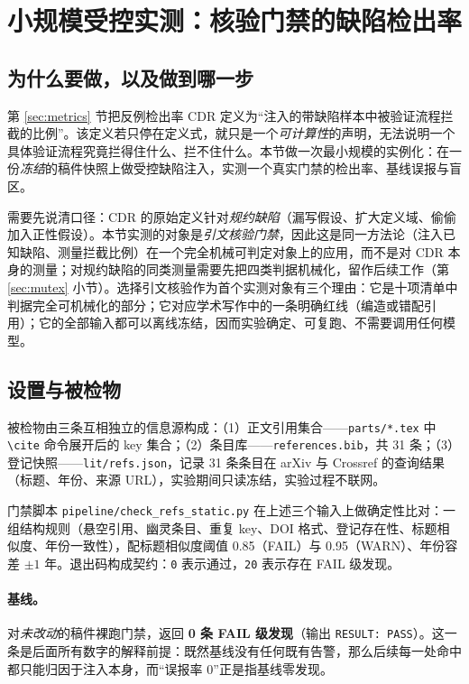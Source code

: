 \section{小规模受控实测：核验门禁的缺陷检出率}\label{sec:experiment}

\subsection{为什么要做，以及做到哪一步}

第 \ref{sec:metrics} 节把反例检出率 $\mathrm{CDR}$ 定义为“注入的带缺陷样本中被验证流程拦截的比例”。该定义若只停在定义式，就只是一个\emph{可计算性}的声明，无法说明一个具体验证流程究竟拦得住什么、拦不住什么。本节做一次最小规模的实例化：在一份\emph{冻结}的稿件快照上做受控缺陷注入，实测一个真实门禁的检出率、基线误报与盲区。

需要先说清口径：$\mathrm{CDR}$ 的原始定义针对\emph{规约缺陷}（漏写假设、扩大定义域、偷偷加入正性假设）。本节实测的对象是\emph{引文核验门禁}，因此这是同一方法论（注入已知缺陷、测量拦截比例）在一个完全机械可判定对象上的应用，而不是对 $\mathrm{CDR}$ 本身的测量；对规约缺陷的同类测量需要先把四类判据机械化，留作后续工作（第 \ref{sec:mutex} 小节）。选择引文核验作为首个实测对象有三个理由：它是十项清单中判据完全可机械化的部分；它对应学术写作中的一条明确红线（编造或错配引用）；它的全部输入都可以离线冻结，因而实验确定、可复跑、不需要调用任何模型。

\subsection{设置与被检物}

被检物由三条互相独立的信息源构成：（1）正文引用集合——\texttt{parts/*.tex} 中 \texttt{\textbackslash cite} 命令展开后的 key 集合；（2）条目库——\texttt{references.bib}，共 31 条；（3）登记快照——\texttt{lit/refs.json}，记录 31 条条目在 arXiv 与 Crossref 的查询结果（标题、年份、来源 URL），实验期间只读冻结，实验过程不联网。

门禁脚本 \texttt{pipeline/check\_refs\_static.py} 在上述三个输入上做确定性比对：一组结构规则（悬空引用、幽灵条目、重复 key、DOI 格式、登记存在性、标题相似度、年份一致性），配标题相似度阈值 0.85（FAIL）与 0.95（WARN）、年份容差 $\pm 1$ 年。退出码构成契约：\texttt{0} 表示通过，\texttt{20} 表示存在 FAIL 级发现。

\paragraph{基线。}对\emph{未改动}的稿件裸跑门禁，返回 \textbf{0 条 FAIL 级发现}（输出 \texttt{RESULT: PASS}）。这一条是后面所有数字的解释前提：既然基线没有任何既有告警，那么后续每一处命中都只能归因于注入本身，而“误报率 0”正是指基线零发现。

